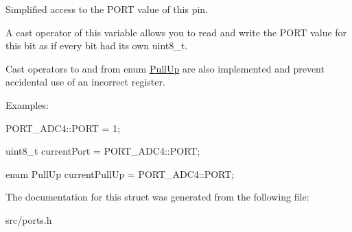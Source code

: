 Simplified access to the P\+O\+RT value of this pin. 

A cast operator of this variable allows you to read and write the P\+O\+RT value for this bit as if every bit had its own uint8\+\_\+t.

Cast operators to and from enum \hyperlink{namespaceALIBVR__NAMESPACE__PORTS_ac5b094ab18f4038d56ff1401ebe8d4f3}{Pull\+Up} are also implemented and prevent accidental use of an incorrect register.

Examples\+:


\begin{DoxyItemize}
\item {\ttfamily P\+O\+R\+T\+\_\+\+A\+D\+C4\+::\+P\+O\+RT = 1;}
\item {\ttfamily uint8\+\_\+t current\+Port = P\+O\+R\+T\+\_\+\+A\+D\+C4\+::\+P\+O\+RT;}
\item {\ttfamily enum Pull\+Up current\+Pull\+Up = P\+O\+R\+T\+\_\+\+A\+D\+C4\+::\+P\+O\+RT;} 
\end{DoxyItemize}

The documentation for this struct was generated from the following file\+:\begin{DoxyCompactItemize}
\item 
src/ports.\+h\end{DoxyCompactItemize}
